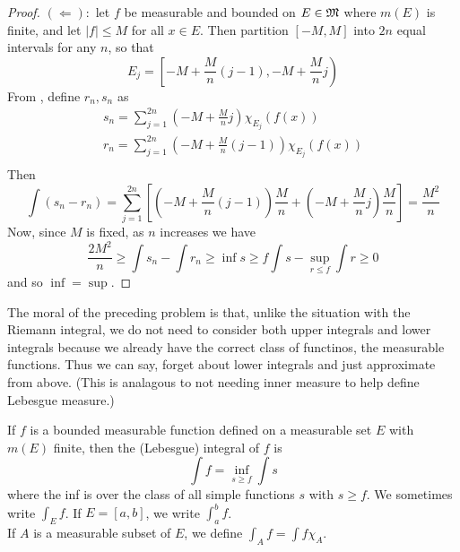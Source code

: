 \begin{pblm}
\begin{proof}
	\noindent $(\Leftarrow): $ let $f$ be measurable and bounded on $E \in \mathfrak{M}$ where 
	$m(E)$ is finite, and let $|f| \le M$ for all $x \in E$. Then partition 
	$[-M, M]$ into $2n$ equal intervals for any $n$, so that 
	\begin{equation*}
		E_j = \left[\left.-M + \frac{M}{n}(j-1), -M + \frac{M}{n}j\right.\right)
	\end{equation*}
	From , define $r_n, s_n$ as 
	\begin{equation*}
	\begin{array}{c}
		s_n = \sum\limits_{j=1}^{2n} (-M + \frac{M}{n}j) \chi_{E_j}(f(x)) \\
		r_n = \sum\limits_{j=1}^{2n} (-M + \frac{M}{n}(j-1)) \chi_{E_j}(f(x)) \\
	\end{array}
	\end{equation*}
	Then 
	\begin{equation*}
		\int(s_n-r_n) = \sum\limits_{j=1}^{2n}\left[\left(-M+\frac{M}{n}(j-1)\right)\frac{M}{n} + 
				\left(-M + \frac{M}{n}j\right)\frac{M}{n}\right] 
				= \frac{M^2}{n}
	\end{equation*}
	Now, since $M$ is fixed, as $n$ increases we have 
	\begin{equation*}
		\frac{2M^2}{n} \ge \int s_n - \int r_n \ge \inf\limits{s\ge f}\int s - \sup\limits_{r\le f}\int r \ge 0
	\end{equation*}
	and so $\inf = \sup$. 
\end{proof}
\end{pblm}

\begin{rmk} %
	The moral of the preceding problem is that, unlike the situation with the Riemann 
	integral, we do not need to consider both upper integrals and lower integrals because 
	we already have the correct class of functinos, the measurable functions. Thus we can 
	say, forget about lower integrals and just approximate from above. (This is analagous 
	to not needing inner measure to help define Lebesgue measure.)
\end{rmk}

\begin{defn}\label{d:lebesgueintegral}%
	If $f$ is a bounded measurable function defined on a measurable set $E$ with $m(E)$ 
	finite, then the (Lebesgue) integral of $f$ is 
	\begin{equation*}
		\int f = \inf\limits_{s \ge f}\int s
	\end{equation*}
	where the inf is over the class of all simple functions $s$ with $s \ge f$. We sometimes 
	write $\int_E f$. If $E = [a, b]$, we write $\int_a^b f$.\\ 
	If $A$ is a measurable subset of $E$, we define $\int_A f = \int f\chi_A$. 
\end{defn}

